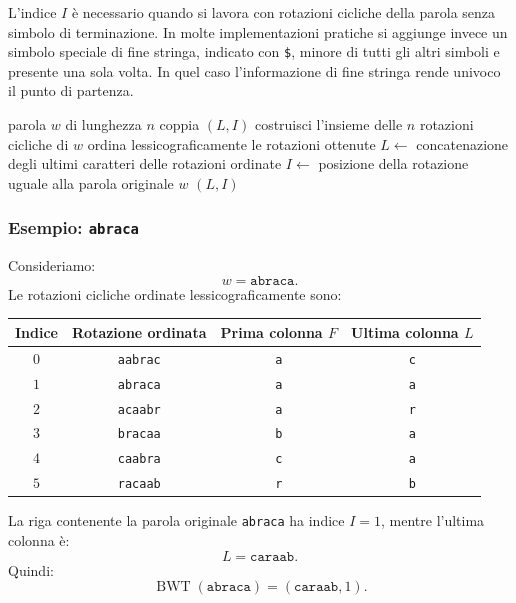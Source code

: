 \documentclass{article}
\theoremstyle{definition}
\numberwithin{equation}{section}
\begin{document}
L'indice $I$ è necessario quando si lavora con rotazioni cicliche della parola senza simbolo di terminazione. In molte implementazioni pratiche si aggiunge invece un simbolo speciale di fine stringa, indicato con \texttt{\$}, minore di tutti gli altri simboli e presente una sola volta. In quel caso l'informazione di fine stringa rende univoco il punto di partenza.

\begin{algorithm}[htpb]
    \caption{ tramite rotazioni cicliche}
    \begin{algorithmic}[1]
        \Require parola $w$ di lunghezza $n$
        \Ensure coppia $(L,I)$
        \State costruisci l'insieme delle $n$ rotazioni cicliche di $w$
        \State ordina lessicograficamente le rotazioni ottenute
        \State $L\gets$ concatenazione degli ultimi caratteri delle rotazioni ordinate
        \State $I\gets$ posizione della rotazione uguale alla parola originale $w$
        \State \Return $(L,I)$
    \end{algorithmic}
\end{algorithm}

\subsubsection{Esempio: \texttt{abraca}}
Consideriamo:
\[
    w=\texttt{abraca}.
\]
Le rotazioni cicliche ordinate lessicograficamente sono:
\begin{center}
    \begin{tabular}{|c|c|c|c|}
        \hline
        \textbf{Indice} & \textbf{Rotazione ordinata} & \textbf{Prima colonna $F$} & \textbf{Ultima colonna $L$} \\ \hline
        $0$             & \texttt{aabrac}             & \texttt{a}                 & \texttt{c}                  \\ \hline
        $1$             & \texttt{abraca}             & \texttt{a}                 & \texttt{a}                  \\ \hline
        $2$             & \texttt{acaabr}             & \texttt{a}                 & \texttt{r}                  \\ \hline
        $3$             & \texttt{bracaa}             & \texttt{b}                 & \texttt{a}                  \\ \hline
        $4$             & \texttt{caabra}             & \texttt{c}                 & \texttt{a}                  \\ \hline
        $5$             & \texttt{racaab}             & \texttt{r}                 & \texttt{b}                  \\ \hline
    \end{tabular}
\end{center}
La riga contenente la parola originale \texttt{abraca} ha indice $I=1$, mentre l'ultima colonna è:
\[
    L=\texttt{caraab}.
\]
Quindi:
\[
    \operatorname{BWT}(\texttt{abraca})=(\texttt{caraab},1).
\]
\end{document}
